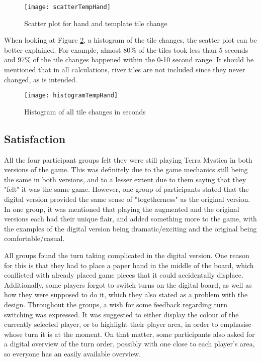 \begin{figure}[h!]
	\centering
	\texttt{[image: scatterTempHand]}
	\caption{Scatter plot for hand and template tile change} 
	\label{fig:techScatter1}
\end{figure}

When looking at Figure \ref{fig:techHistogram}, a histogram of the tile changes, the scatter plot can be better explained. For example, almost 80\% of the tiles took less than 5 seconds and 97\% of the tile changes happened within the 0-10 second range. It should be mentioned that in all calculations, river tiles are not included since they never changed, as is intended. 

\begin{figure}[h!]
	\centering
	\texttt{[image: histogramTempHand]}
	\caption{Histogram of all tile changes in seconds} 
	\label{fig:techHistogram}
\end{figure}

\subsection{Satisfaction}\label{sec:satisfactionResult}
All the four participant groups felt they were still playing Terra Mystica in both versions of the game. This was definitely due to the game mechanics still being the same in both versions, and to a lesser extent due to them saying that they "felt" it was the same game. However, one group of participants stated that the digital version provided the same sense of "togetherness" as the original version. In one group, it was mentioned that playing the augmented and the original versions each had their unique flair, and added something more to the game, with the examples of the digital version being dramatic/exciting and the original being comfortable/casual. 

All groups found the turn taking complicated in the digital version. One reason for this is that they had to place a paper hand in the middle of the board, which conflicted with already placed game pieces that it could accidentally displace. Additionally, some players forgot to switch turns on the digital board, as well as how they were supposed to do it, which they also stated as a problem with the design. Throughout the groups, a wish for some feedback regarding turn switching was expressed. It was suggested to either display the colour of the currently selected player, or to highlight their player area, in order to emphasise whose turn it is at the moment. On that matter, some participants also asked for a digital overview of the turn order, possibly with one close to each player’s area, so everyone has an easily available overview. 

